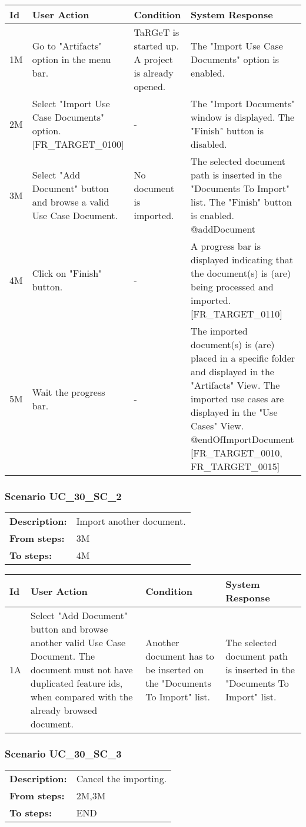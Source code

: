 \documentclass[a4paper,11pt]{article}
\newcommand{\bl}{\\ \hline}
\begin{document}
\begin{tabular}{|p{0.8in}|p{1.6in}|p{1.6in}|p{1.6in}|}
\hline
Id & User Action & Condition & System Response  \bl 
1M & Go to "Artifacts" option in the menu bar. & TaRGeT is started up. A project is already opened. & The "Import Use Case Documents" option is enabled. \bl 
2M & Select "Import Use Case Documents" option. [FR_TARGET_0100] & - & The "Import Documents" window is displayed. The "Finish" button is disabled. \bl 
3M & Select "Add Document" button and browse a valid Use Case Document. & No document is imported. & 
		      The selected document path is inserted in the "Documents To Import" list. The "Finish" button is enabled. @addDocument
		     \bl 
4M & Click on "Finish" button. & - & A progress bar is displayed indicating that the document(s) is (are) being processed and imported.[FR_TARGET_0110] \bl 
5M & Wait the progress bar. & - & The imported document(s) is (are) placed in a specific folder and displayed in the "Artifacts" View. The imported use cases are displayed in the "Use Cases" View. @endOfImportDocument [FR_TARGET_0010, FR_TARGET_0015] \bl 
\end{tabular}
\subsubsection*{Scenario UC_30_SC_2}
\begin{tabular}{p{1in}p{4in}}
{\bf Description:} & Import another document. \\
{\bf From steps:} & 3M \\
{\bf To steps:} & 4M \\
\end{tabular}
 
\begin{tabular}{|p{0.8in}|p{1.6in}|p{1.6in}|p{1.6in}|}
\hline
Id & User Action & Condition & System Response  \bl 
1A & Select "Add Document" button and browse another valid Use Case Document. The document must not have duplicated feature ids, when compared with the already browsed document. & Another document has to be inserted on the "Documents To Import" list. & The selected document path is inserted in the "Documents To Import" list. \bl 
\end{tabular}
\subsubsection*{Scenario UC_30_SC_3}
\begin{tabular}{p{1in}p{4in}}
{\bf Description:} & Cancel the importing. \\
{\bf From steps:} & 2M,3M \\
{\bf To steps:} & END \\
\end{tabular}
 
\end{document}
